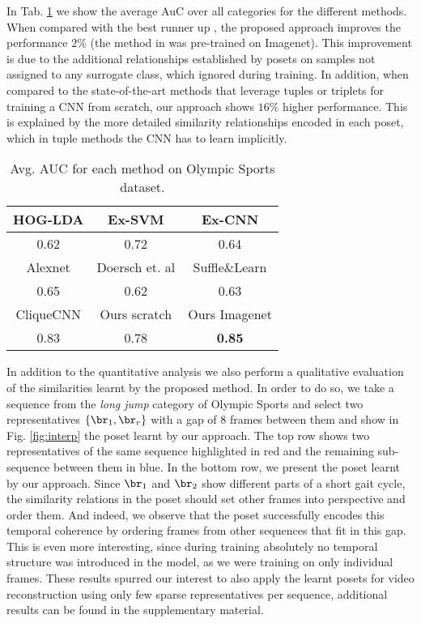 \documentclass[10pt,twocolumn,letterpaper]{article}
\begin{document}
In Tab. \ref{tab:avg_auc} we show the average AuC over all categories for the different methods. When compared with the best runner up \cite{cliquecnn}, the proposed approach improves the performance $2\%$ (the method in \cite{cliquecnn} was pre-trained on Imagenet). This improvement is due to the additional relationships established by posets on samples not assigned to any surrogate class, which \cite{cliquecnn} ignored during training. In addition, when compared to the state-of-the-art methods that leverage tuples \cite{ConvNetpretext1} or triplets \cite{shuffleandlearn} for training a CNN from scratch, our approach shows $16\%$ higher performance. This is explained by the more detailed similarity relationships encoded in each poset, which in tuple methods the CNN has to learn implicitly.




\begin{table}
    \scriptsize
    \centering
    \begin{tabular}{|c|c|c|}
    \hline
    HOG-LDA \cite{hoglda} & Ex-SVM \cite{exemplarsvm} & Ex-CNN \cite{exemplarcnn}\\ \hline 
    0.62 &  0.72  &   0.64   \\ \hline \hline
    Alexnet \cite{alexnet} & Doersch et. al \cite{ConvNetpretext1} & Suffle\&Learn \cite{shuffleandlearn}   \\ \hline
    0.65 & 0.62 & 0.63 \\ \hline \hline
    CliqueCNN \cite{cliquecnn} & Ours scratch &  Ours Imagenet\\ \hline
      0.83 & 0.78 & \textbf{0.85} \\ \hline
    \end{tabular}
    \caption{Avg. AUC for each method on Olympic Sports dataset.}
    \label{tab:avg_auc}
\end{table}


In addition to the quantitative analysis we also perform a qualitative evaluation of the similarities learnt by the proposed method. In order to do so, we take a sequence from the \textit{long jump} category of Olympic Sports and select two representatives $\{\br_1, \br_r\}$ with a gap of $8$ frames between them and show in Fig. \ref{fig:interp} the poset learnt by our approach. The top row shows two representatives of the same sequence highlighted in red and the remaining sub-sequence between them in blue. In the bottom row, we present the poset learnt by our approach.
Since $\br_1$ and $\br_2$ show different parts of a short gait cycle, the similarity relations in the poset should set other frames into perspective and order them.
And indeed, we observe that the poset successfully encodes this temporal coherence by ordering frames from other sequences that fit in this gap. This is even more interesting, since during training absolutely no temporal structure was introduced in the model, as we were training on only individual frames. These results spurred our interest to also apply the learnt posets for video reconstruction using only few sparse representatives per sequence, additional results can be found in the supplementary material.
\end{document}
